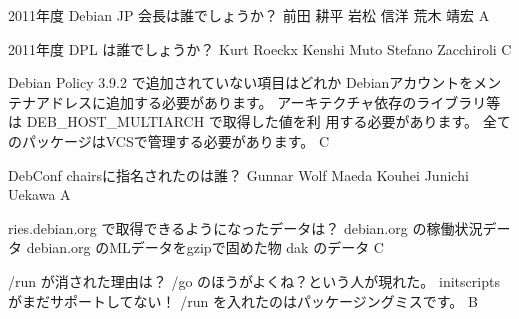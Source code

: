 %

\santaku
{2011年度 Debian JP 会長は誰でしょうか？}
{前田 耕平}
{岩松 信洋}
{荒木 靖宏}
{A}
{}

\santaku
{2011年度 DPL は誰でしょうか？}
{Kurt Roeckx}
{Kenshi Muto}
{Stefano Zacchiroli}
{C}
{}

\santaku
{Debian Policy 3.9.2 で追加されていない項目はどれか}
{Debianアカウントをメンテナアドレスに追加する必要があります。}
{アーキテクチャ依存のライブラリ等は DEB\_HOST\_MULTIARCH で取得した値を利
用する必要があります。}
{全てのパッケージはVCSで管理する必要があります。}
{C}
{}

\santaku
{DebConf chairsに指名されたのは誰？}
{Gunnar Wolf}
{Maeda Kouhei}
{Junichi Uekawa}
{A}
{}

\santaku
{ries.debian.org で取得できるようになったデータは？}
{debian.org の稼働状況データ}
{debian.org のMLデータをgzipで固めた物}
{dak のデータ}
{C}
{}

\santaku
{/run が消された理由は？}
{/go のほうがよくね？という人が現れた。}
{initscripts がまだサポートしてない！}
{/run を入れたのはパッケージングミスです。}
{B}
{}
